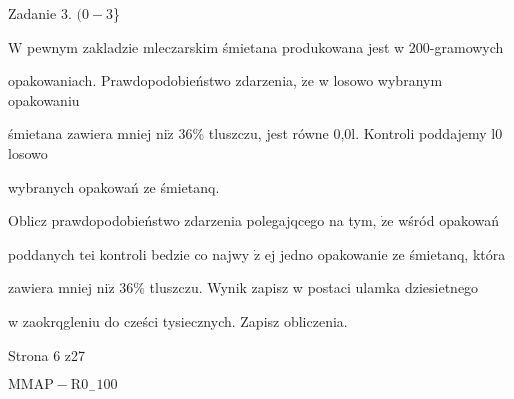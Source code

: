 \documentclass[a4paper,12pt]{article}
\begin{document}
Zadanie 3. $(0-3$\}

$\mathrm{W}$ pewnym zakladzie mleczarskim śmietana produkowana jest w 200-gramowych

opakowaniach. Prawdopodobieństwo zdarzenia, $\dot{\mathrm{z}}\mathrm{e}$ w losowo wybranym opakowaniu

śmietana zawiera mniej $\mathrm{n}\mathrm{i}\dot{\mathrm{z}}$ 36\% tluszczu, jest równe 0,0l. Kontroli poddajemy l0 losowo

wybranych opakowań ze śmietanq.

Oblicz prawdopodobieństwo zdarzenia polegajqcego na tym, $\dot{\mathrm{z}}\mathrm{e}$ wśród opakowań

poddanych $\mathrm{t}\mathrm{e}\mathrm{i}$ kontroli bedzie co najwy $\dot{\mathrm{z}}$ ej jedno opakowanie ze śmietanq, która

zawiera mniej $\mathrm{n}\mathrm{i}\dot{\mathrm{z}}$ 36\% tluszczu. Wynik zapisz w postaci ulamka dziesietnego

w zaokrqgleniu do cześci tysiecznych. Zapisz obliczenia.

Strona 6 z27

$\mathrm{M}\mathrm{M}\mathrm{A}\mathrm{P}-\mathrm{R}0_{-}100$
\end{document}
